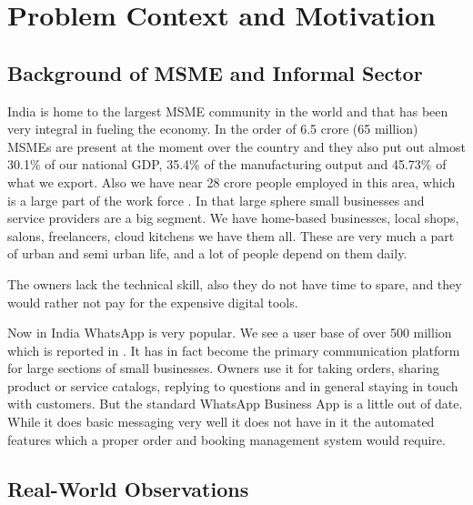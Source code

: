 
\chapter{Problem Context and Motivation}

\section{Background of MSME and Informal Sector}

India is home to the largest MSME community in the world and that has been very integral in fueling the economy. In the order of 6.5 crore (65 million) MSMEs are present at the moment over the country and they also put out almost 30.1\% of our national GDP, 35.4\% of the manufacturing output and 45.73\% of what we export. Also we have near 28 crore people employed in this area, which is a large part of the work force \cite{pib_msme2025}. In that large sphere small businesses and service providers are a big segment. We have home-based businesses, local shops, salons, freelancers, cloud kitchens we have them all. These are very much a part of urban and semi urban life, and a lot of people depend on them daily.

The owners lack the technical skill, also they do not have time to spare, and they would rather not pay for the expensive digital tools.

Now in India WhatsApp is very popular. We see a user base of over 500 million which is reported in \cite{hyperleap_india2026}. It has in fact become the primary communication platform for large sections of small businesses. Owners use it for taking orders, sharing product or service catalogs, replying to questions and in general staying in touch with customers. But the standard WhatsApp Business App is a little out of date. While it does basic messaging very well it does not have in it the automated features which a proper order and booking management system would require.


\section{Real-World Observations}

